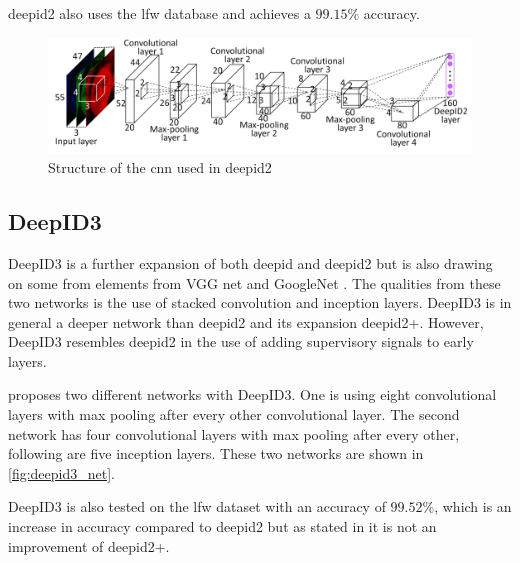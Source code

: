 \gls{deepid2} also uses the \gls{lfw} database and achieves a $99.15\%$ accuracy.

\begin{figure}[h]
	\centering
	\includegraphics[width=\textwidth]{figures/deepid2_convnet}
	\caption{Structure of the \gls{cnn} used in \gls{deepid2} \citep{sun2014}}
	\label{fig:deepid2_convnet}
\end{figure}

\subsection{DeepID3}
DeepID3 is a further expansion of both \gls{deepid} and \gls{deepid2} but is also drawing on some from elements from VGG net and GoogleNet \citep{sun2015}. The qualities from these two networks is the use of stacked convolution and inception layers. DeepID3 is in general a deeper network than \gls{deepid2} and its expansion \gls{deepid2}+. However, DeepID3 resembles \gls{deepid2} in the use of adding supervisory signals to early layers.

\cite{sun2015} proposes two different networks with DeepID3. One is using eight convolutional layers with max pooling after every other convolutional layer. The second network has four convolutional layers with max pooling after every other, following are five inception layers. These two networks are shown in \autoref{fig:deepid3_net}.

DeepID3 is also tested on the \gls{lfw} dataset with an accuracy of $99.52\%$, which is an increase in accuracy compared to \gls{deepid2} but as stated in \cite{sun2015} it is not an improvement of \gls{deepid2}+.\\

